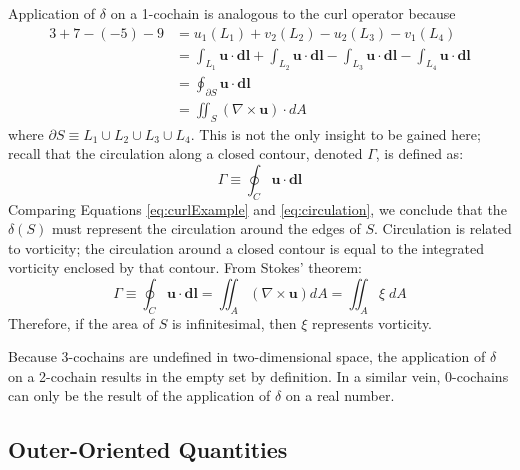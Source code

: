 Application of $\delta$ on a 1-cochain is analogous to the curl operator because
\begin{equation}
    \begin{split}
        3 + 7 - (-5) - 9 &= u_1(L_1) + v_2(L_2) - u_2(L_3) - v_1(L_4) \\
        &= \int_{L_1} \mathbf{u} \cdot \mathbf{dl} + \int_{L_2} \mathbf{u} \cdot \mathbf{dl} - \int_{L_3} \mathbf{u} \cdot \mathbf{dl} - \int_{L_4} \mathbf{u} \cdot \mathbf{dl} \\
        &= \oint_{\partial S} \mathbf{u} \cdot \mathbf{dl} \\
        &= \iint_{S} \left( \nabla \times \mathbf{u} \right) \cdot dA
    \end{split}
    \label{eq:curlExample}
\end{equation}
where $\partial S \equiv L_1 \cup L_2 \cup L_3 \cup L_4$. This is not the only insight to be gained here; recall that the circulation along a closed contour, denoted $\Gamma$, is defined as:
\begin{equation}
    \Gamma \equiv \oint_C \mathbf{u} \cdot \mathbf{dl}
    \label{eq:circulation}
\end{equation}
Comparing Equations \eqref{eq:curlExample} and \eqref{eq:circulation}, we conclude that the $\delta(S)$ must represent the circulation around the edges of $S$. Circulation is related to vorticity; the circulation around a closed contour is equal to the integrated vorticity enclosed by that contour. From Stokes' theorem:
\begin{equation}
    \Gamma \equiv \oint_C \mathbf{u} \cdot \mathbf{dl} = \iint_A \left( \nabla \times \mathbf{u} \right) dA = \iint_A \xi \; dA
\end{equation}
Therefore, if the area of $S$ is infinitesimal, then $\xi$ represents vorticity.

Because $3$-cochains are undefined in two-dimensional space, the application of $\delta$ on a 2-cochain results in the empty set by definition. In a similar vein, 0-cochains can only be the result of the application of $\delta$ on a real number.

\subsection{Outer-Oriented Quantities}

